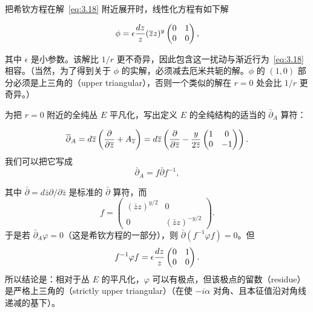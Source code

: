 把希钦方程在解~\eqref{eq:3.18} 附近展开时，线性化方程有如下解

\setcounter{equation}{18}
\begin{equation}\label{eq:3.19}
  \phi=\epsilon {dz\over z}(\bar z z)^{y}\left(\begin{matrix}0&1\\ 0&0\end{matrix}\right),
\end{equation}

其中 $\epsilon$ 是小参数。该解比 $1/r$ 更不奇异，因此包含这一扰动与渐近行为~\eqref{eq:3.18} 相容。（当然，为了得到关于 $\phi$ 的实解，必须减去厄米共轭的解。$\phi$ 的 $(1,0)$ 部分必须是上三角的（upper triangular），否则一个类似的解在 $r=0$ 处会比 $1/r$ 更奇异。）

为把 $r=0$ 附近的全纯丛 $E$ 平凡化，写出定义 $E$ 的全纯结构的适当的
 $\bar\partial_A$ 算符：

\setcounter{equation}{19}
\begin{equation}\label{eq:3.20}
  \bar\partial_A=d\bar z\left({\partial\over\partial\bar
z}+A_{\bar z}\right)= d\bar z\left({\partial\over\partial\bar
z}-{y\over 2\bar z}\left(\begin{matrix}1&0\\ 0&-1\end{matrix}\right) \right).
\end{equation}
我们可以把它写成
\setcounter{equation}{20}
\begin{equation}\label{eq:3.21}
  \bar\partial_A=f\bar\partial f^{-1},
\end{equation}

其中 $\bar\partial =d\bar z\partial/\partial\bar z$ 是标准的
$\bar\partial$ 算符，而
\setcounter{equation}{21}
\begin{equation}\label{eq:3.22}
  f=\left(\begin{matrix}(\bar z
z)^{y/2}& 0\\ 0& (\bar z z)^{-y/2}\end{matrix}\right).
\end{equation}
于是若 $\bar\partial_A\varphi=0$（这是希钦方程的一部分），则 $\bar\partial(f^{-1}\varphi f)=0$。但
\setcounter{equation}{22}
\begin{equation}\label{eq:3.23}
  f^{-1}\varphi
f= \epsilon {dz\over z}\left(\begin{matrix}0&1\\ 0&0\end{matrix}\right).
\end{equation}
所以结论是：相对于丛 $E$ 的平凡化，$\varphi$ 可以有极点，但该极点的留数（residue）是严格上三角的（strictly upper triangular）（在使 $-i\alpha$ 对角、且本征值沿对角线递减的基下）。

